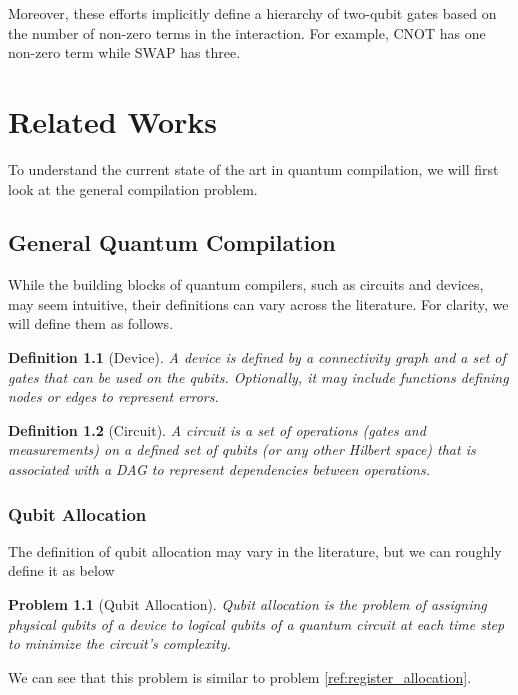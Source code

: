 \documentclass{report}
\newtheorem{definition}{Definition}
\newtheorem{problem}{Problem}
\begin{document}
Moreover, these efforts implicitly define a hierarchy of two-qubit gates based on the number of non-zero terms in the interaction. For example, CNOT has one non-zero term while SWAP has three.

\chapter{Related Works}\label{chap:related_works}

To understand the current state of the art in quantum compilation, we will first look at the general compilation problem. 

\section{General Quantum Compilation}

While the building blocks of quantum compilers, such as circuits and devices, may seem intuitive, their definitions can vary across the literature. For clarity, we will define them as follows.

\begin{definition}[Device]
  A device is defined by a connectivity graph and a set of gates that can be used on the qubits. Optionally, it may include functions defining nodes or edges to represent errors.
\end{definition}

\begin{definition}[Circuit]
  A circuit is a set of operations (gates and measurements) on a defined set of qubits (or any other Hilbert space) that is associated with a DAG to represent dependencies between operations.
\end{definition}

\subsection{Qubit Allocation}

The definition of qubit allocation may vary in the literature, but we can roughly define it as below

\begin{problem}[Qubit Allocation]
  Qubit allocation is the problem of assigning physical qubits of a device to logical qubits of a quantum circuit at each time step to minimize the circuit's complexity.
\end{problem}

We can see that this problem is similar to problem \ref{ref:register_allocation}.
\end{document}
